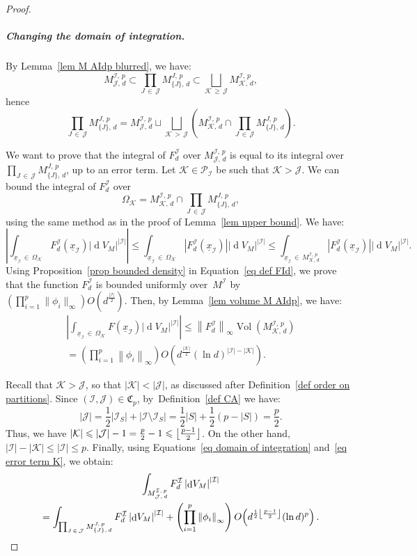 \documentclass[10pt]{amsart}
\theoremstyle{definition}\newtheorem{defi}[theo]{Definition}\newtheorem{rema}[theo]{Remark}\newtheorem{exam}[theo]{Example}\newtheorem{exem}[theo]{Example}\newtheorem{nota}[theo]{Notation}
\DeclareMathOperator{\dmesure}{d}
\DeclareMathOperator{\Vol}{Vol}
\DeclarePairedDelimiter{\floor}{\lfloor}{\rfloor}
\newcommand{\I}{\mathcal{I}}
\newcommand{\J}{\mathcal{J}}
\newcommand{\K}{\mathcal{K}}
\newcommand{\frkC}{\mathfrak{C}}
\newcommand{\pa}{\mathcal{P}\!}
\newcommand{\norm}[1]{\left\lvert #1 \right\rvert}
\newcommand{\Norm}[1]{\left\lVert #1 \right\rVert}
\newcommand{\rmes}[1]{\norm{\dmesure\! V_{#1}}}
\newcommand{\vol}[1]{\Vol\!\left(#1\right)}
\renewcommand{\geq}{\geqslant}
\renewcommand{\leq}{\leqslant}
\begin{document}
\begin{proof}
\subparagraph*{Changing the domain of integration.}
By Lemma~\ref{lem M AIdp blurred}, we have:
\[
M^{\I,\,p}_{\J,\,d} \subset \prod_{J\,\in\,\J} M^{J,\,p}_{\{J\},\,d} \subset \bigsqcup_{\K\,\geq\,\J} M^{\I,\,p}_{\K,\,d},
\]
hence
\begin{equation}\label{eq domain of integration}
\prod_{J\,\in\,\J} M^{J,\,p}_{\{J\},\,d} = M^{\I,\,p}_{\J,\,d} \sqcup \bigsqcup_{\K\,>\,\J} \left(M^{\I,\,p}_{\K,\,d} \cap \prod_{J\,\in\,\J} M^{J,\,p}_{\{J\},\,d}\right).
\end{equation}

We want to prove that the integral of $F_d^\I$ over $M^{\I,\,p}_{\J,\,d}$ is equal to its integral over $\prod_{J\,\in\,\J} M^{J,\,p}_{\{J\},\,d}$, up to an error term. Let $\K \in \pa_\I$ be such that $\K > \J$. We can bound the integral of $F_d^\I$ over
\[
\Omega_\K = M^{\I,\,p}_{\K,\,d} \cap \prod_{J\,\in\,\J} M^{J,\,p}_{\{J\},\,d},
\]
using the same method as in the proof of Lemma~\ref{lem upper bound}. We have:
\[
\norm{\int_{\underline{x}_\I\,\in\,\Omega_\K} F_d^\I\left(\underline{x}_\I\right) \rmes{M}^{\norm{\I}}} \leq \int_{\underline{x}_\I\,\in\,\Omega_\K} \norm{F_d^\I\left(\underline{x}_\I\right)} \rmes{M}^{\norm{\I}} \leq \int_{\underline{x}_\I\,\in\,M^{\I,\,p}_{\K,\,d}} \norm{F_d^\I\left(\underline{x}_\I\right)} \rmes{M}^{\norm{\I}}.
\]
Using Proposition~\ref{prop bounded density} in Equation~\eqref{eq def FId}, we prove that the function $F_d^\I$ is bounded uniformly over~$M^\I$ by $(\prod_{i=1}^p \|\phi_i\|_\infty) O(d^\frac{|\I|}{2})$. Then, by Lemma~\ref{lem volume M AIdp}, we have:
\begin{multline}\label{eq error term K}
\norm{\int_{\underline{x}_\I\,\in\,\Omega_\K} F(\underline{x}_\I) \rmes{M}^{\norm{\I}}} \leq \Norm{F^\I_d}_\infty \vol{M^{\I,\,p}_{\K,\,d}}\\
= \left(\prod_{i=1}^p \Norm{\phi_i}_\infty\right) O\!\left(d^{\frac{\norm{\K}}{2}}(\ln d)^{\norm{\I}-\norm{\K}}\right).
\end{multline}

Recall that $\K > \J$, so that $|\K| < |\J|$, as discussed after Definition~\ref{def order on partitions}. Since $(\I,\J) \in \frkC_p$, by~Definition~\ref{def CA} we have:
\[
\norm{\J} = \frac{1}{2}\norm{\I_S} + \norm{\I \setminus \I_S} = \frac{1}{2}\norm{S} + \frac{1}{2}\left(p - \norm{S}\right) = \frac{p}{2}.
\]
Thus, we have $|\K| \leq |\J|-1 = \frac{p}{2}-1 \leq \floor*{\frac{p-1}{2}}$. On the other hand, $|\I| - |\K| \leq |\I| \leq p$. Finally, using Equations~\eqref{eq domain of integration} and~\eqref{eq error term K}, we obtain:
\begin{multline}\label{eq integral FId}
\int_{M^{\I,\,p}_{\J,\,d}} F_d^\I \rmes{M}^{\norm{\I}}\\
= \int_{\prod_{J\,\in\,\J} M^{J,\,p}_{\{J\},\,d}} F_d^\I \rmes{M}^{\norm{\I}} +\left(\prod_{i=1}^p \Norm{\phi_i}_\infty\right)O\!\left(d^{\frac{1}{2}\floor*{\frac{p-1}{2}}}(\ln d)^p\right).
\end{multline}


\end{proof}
\end{document}
